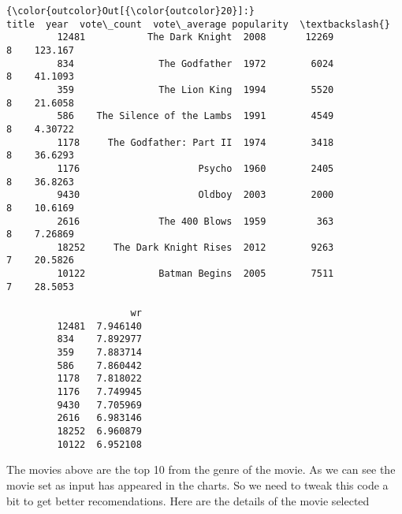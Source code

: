 \documentclass[11pt]{article}
\begin{document}
\begin{Verbatim}[commandchars=\\\{\}]
{\color{outcolor}Out[{\color{outcolor}20}]:}                           title  year  vote\_count  vote\_average popularity  \textbackslash{}
         12481           The Dark Knight  2008       12269             8    123.167   
         834               The Godfather  1972        6024             8    41.1093   
         359               The Lion King  1994        5520             8    21.6058   
         586    The Silence of the Lambs  1991        4549             8    4.30722   
         1178     The Godfather: Part II  1974        3418             8    36.6293   
         1176                     Psycho  1960        2405             8    36.8263   
         9430                     Oldboy  2003        2000             8    10.6169   
         2616              The 400 Blows  1959         363             8    7.26869   
         18252     The Dark Knight Rises  2012        9263             7    20.5826   
         10122             Batman Begins  2005        7511             7    28.5053   
         
                      wr  
         12481  7.946140  
         834    7.892977  
         359    7.883714  
         586    7.860442  
         1178   7.818022  
         1176   7.749945  
         9430   7.705969  
         2616   6.983146  
         18252  6.960879  
         10122  6.952108  
\end{Verbatim}
            
    The movies above are the top 10 from the genre of the movie. As we can
see the movie set as input has appeared in the charts. So we need to
tweak this code a bit to get better recomendations. Here are the details
of the movie selected
\end{document}
